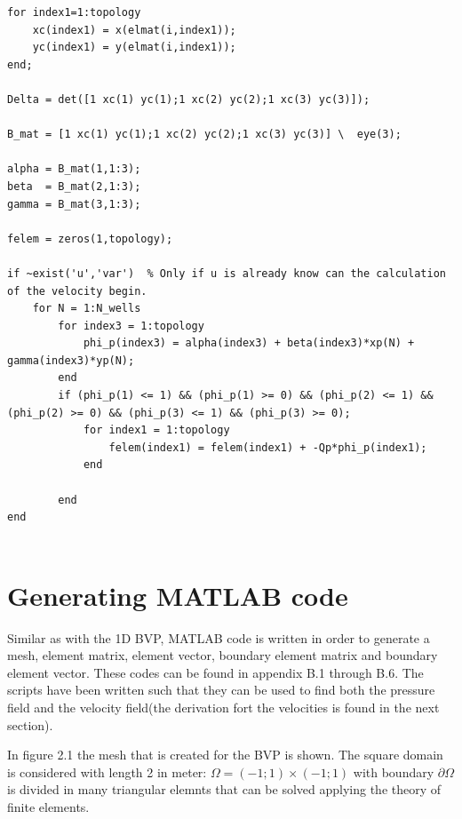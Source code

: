 \documentclass[a4paper]{report}
\begin{document}
\begin{lstlisting}
for index1=1:topology
	xc(index1) = x(elmat(i,index1));
	yc(index1) = y(elmat(i,index1));
end;

Delta = det([1 xc(1) yc(1);1 xc(2) yc(2);1 xc(3) yc(3)]);

B_mat = [1 xc(1) yc(1);1 xc(2) yc(2);1 xc(3) yc(3)] \  eye(3);

alpha = B_mat(1,1:3);
beta  = B_mat(2,1:3);
gamma = B_mat(3,1:3);

felem = zeros(1,topology);

if ~exist('u','var')  % Only if u is already know can the calculation of the velocity begin.
	for N = 1:N_wells
		for index3 = 1:topology
			phi_p(index3) = alpha(index3) + beta(index3)*xp(N) + gamma(index3)*yp(N);
		end
		if (phi_p(1) <= 1) && (phi_p(1) >= 0) && (phi_p(2) <= 1) && (phi_p(2) >= 0) && (phi_p(3) <= 1) && (phi_p(3) >= 0);
			for index1 = 1:topology
				felem(index1) = felem(index1) + -Qp*phi_p(index1); 
			end

		end
end


\end{lstlisting}


\section{Generating MATLAB code}

Similar as with the 1D BVP, MATLAB code is written in order to generate a mesh, element matrix, element vector, boundary element matrix and boundary element vector. These codes can be found in appendix B.1 through B.6. The scripts have been written such that they can be used to find both the pressure field and the velocity field(the derivation fort the velocities is found in the next section).\par
In figure 2.1 the mesh that is created for the BVP is shown. The square domain is considered with length 2 in meter: $\Omega= (-1; 1) \times (-1; 1)$ with boundary $\partial\Omega$ is divided in many triangular elemnts that can be solved applying the theory of finite elements. 
\end{document}
